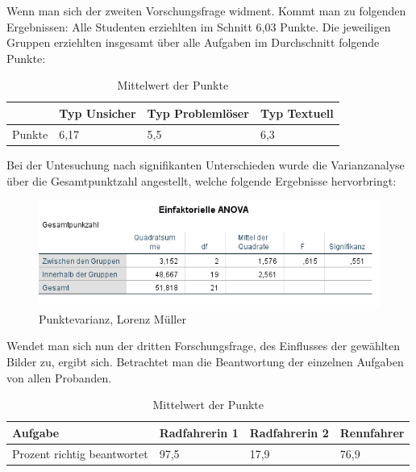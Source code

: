 Wenn man sich der zweiten Vorschungsfrage widment. Kommt man zu folgenden Ergebnissen:
Alle Studenten erziehlten im Schnitt 6,03 Punkte. 
Die jeweiligen Gruppen erziehlten insgesamt über alle Aufgaben im Durchschnitt folgende Punkte:

\begin{table}[!h]
\hspace{-5pt}
\begin{tabularx}{\textwidth + 5pt}{| @{\hspace{3pt}} M || @{\hspace{3pt}} M  | @{\hspace{3pt}} M | @{\hspace{3pt}} M |}
\hline
\textbf{ } & \textbf{Typ Unsicher} & \textbf{Typ Problemlöser} & \textbf{Typ Textuell}\\
\hline
\hline
Punkte        & 6,17 & 5,5 & 6,3\\
\hline
\end{tabularx}
\caption{Mittelwert der Punkte}
\end{table}


Bei der Untesuchung nach signifikanten Unterschieden wurde
die Varianzanalyse über die Gesamtpunktzahl angestellt, welche folgende Ergebnisse hervorbringt:

\begin{figure}[!ht]
\noindent\hspace{0.5mm}\includegraphics[width=15cm]{./Ressourcen/Punktevarianz.png}
\caption{Punktevarianz, Lorenz Müller}
\end{figure}

Wendet man sich nun der dritten Forschungsfrage, des Einflusses der gewählten Bilder zu, ergibt sich.
Betrachtet man die Beantwortung der einzelnen Aufgaben von allen Probanden.

\begin{table}[!h]
\hspace{-5pt}
\begin{tabularx}{\textwidth + 5pt}{| @{\hspace{3pt}} M || @{\hspace{3pt}} M  | @{\hspace{3pt}} M | @{\hspace{3pt}} M |}
\hline
\textbf{Aufgabe} & \textbf{Radfahrerin 1} & \textbf{Radfahrerin 2} & \textbf{Rennfahrer} \\
\hline
\hline
Prozent richtig beantwortet       & 97,5 & 17,9 & 76,9 \\
\hline
\end{tabularx}
\caption{Mittelwert der Punkte}
\end{table}

